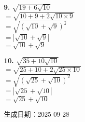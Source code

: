 \documentclass[a4paper,11pt]{article}
\newcommand{\explanationbox}[2][]{%
  \begin{tcolorbox}[explanationstyle, #1]
    #2
  \end{tcolorbox}
}
\begin{document}
\begin{multicols}{2}
\explanationbox{\textbf{9.} $\sqrt{19 + 6\sqrt{10}}$\\[0.3em]$= \sqrt{10+9 + 2\sqrt{10 \times 9}}$\\[0.3em]$= \sqrt{(\sqrt{10} + \sqrt{9})^2}$\\[0.3em]$= |\sqrt{10} + \sqrt{9}|$\\[0.3em]$= \sqrt{10} + \sqrt{9}$}

\explanationbox{\textbf{10.} $\sqrt{35 + 10\sqrt{10}}$\\[0.3em]$= \sqrt{25+10 + 2\sqrt{25 \times 10}}$\\[0.3em]$= \sqrt{(\sqrt{25} + \sqrt{10})^2}$\\[0.3em]$= |\sqrt{25} + \sqrt{10}|$\\[0.3em]$= \sqrt{25} + \sqrt{10}$}

\end{multicols}

\vfill
\begin{center}
\small{生成日期：2025-09-28}
\end{center}
\end{document}
